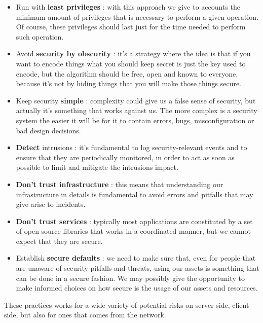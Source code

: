 \begin{itemize}
\begin{itemize}
\end{itemize}
\item Run with \textbf{least privileges} : with this approach we give to accounts the minimum amount of privileges that is necessary to perform a given operation. Of course, these privileges should last just for the time needed to perform such operation.
\item Avoid \textbf{security by obscurity} : it's a strategy where the idea is that if you want to encode things what you should keep secret is just the key used to encode, but the algorithm should be free, open and known to everyone, because it's not by hiding things that you will make those things secure.
\item Keep security \textbf{simple} : complexity could give us a false sense of security, but actually it's something that works against us. The more complex is a security system the easier it will be for it to contain errors, bugs, misconfiguration or bad design decisions.
\item \textbf{Detect} intrusions : it's fundamental to log security-relevant events and to ensure that they are periodically monitored, in order to act as soon as possible to limit and mitigate the intrusions impact.
\item \textbf{Don't trust infrastructure} : this means that understanding our infrastructure in details is fundamental to avoid errors and pitfalls that may give arise to incidents.
\item \textbf{Don't trust services} : typically most applications are constituted by a set of open source libraries that works in a coordinated manner, but we cannot expect that they are secure.
\item Establish \textbf{secure defaults} : we need to make sure that, even for people that are unaware of security pitfalls and threats, using our assets is something that can be done in a secure fashion. We may possibly give the opportunity to make informed choices on how secure is the usage of our assets and resources.
\end{itemize}
These practices works for a wide variety of potential risks on server side, client side, but also for ones that comes from the network.

